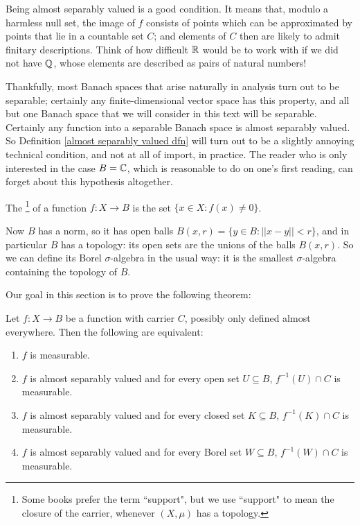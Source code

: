 \begin{subsec}
Being almost separably valued is a good condition. It means that, modulo a harmless null set, the image of $f$ consists of points which can be approximated by points that lie in a countable set $C$; and elements of $C$ then are likely to admit finitary descriptions.
Think of how difficult $\mathbb{R}$ would be to work with if we did not have $\mathbb{Q}$, whose elements are described as pairs of natural numbers!
\end{subsec}

\begin{subsec}
Thankfully, most Banach spaces that arise naturally in analysis turn out to be separable; certainly any finite-dimensional vector space has this property, and all but one Banach space that we will consider in this text will be separable.
Certainly any function into a separable Banach space is almost separably valued. So Definition \ref{almost separably valued dfn} will turn out to be a slightly annoying technical condition, and not at all of import, in practice.
The reader who is only interested in the case $B = \mathbb{C}$, which is reasonable to do on one's first reading, can forget about this hypothesis altogether.
\end{subsec}

\begin{definition}
The \footnote{Some books prefer the term ``support", but we use ``support" to mean the closure of the carrier, whenever $(X, \mu)$ has a topology.} of a function $f: X \to B$ is the set $\{x \in X: f(x) \neq 0\}$.
\end{definition}

\begin{subsec}
Now $B$ has a norm, so it has open balls $B(x, r) = \{y \in B: ||x - y|| < r\}$, and in particular $B$ has a topology: its open sets are the unions of the balls $B(x, r)$.
So we can define its Borel $\sigma$-algebra in the usual way: it is the smallest $\sigma$-algebra containing the topology of $B$.
\end{subsec}

\begin{subsec}
Our goal in this section is to prove the following theorem:
\end{subsec}

\begin{theorem}
\label{characterization of measurable functions}
Let $f: X \to B$ be a function with carrier $C$, possibly only defined almost everywhere. Then the following are equivalent:
\begin{enumerate}
\item $f$ is measurable.
\item $f$ is almost separably valued and for every open set $U \subseteq B$, $f^{-1}(U) \cap C$ is measurable.
\item $f$ is almost separably valued and for every closed set $K \subseteq B$, $f^{-1}(K) \cap C$ is measurable.
\item $f$ is almost separably valued and for every Borel set $W \subseteq B$, $f^{-1}(W) \cap C$ is measurable.
\end{enumerate}
\end{theorem}

